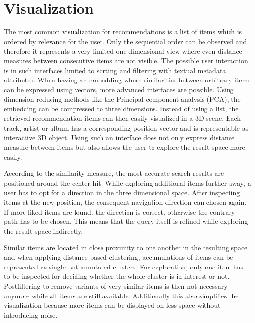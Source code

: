 \documentclass[sigconf]{acmart}
\begin{document}
\section{Visualization}
The most common visualization for recommendations is a list of items which is ordered by relevance for the user. Only the sequential order can be observed and therefore it represents a very limited one dimensional view where even distance measures between consecutive items are not visible. The possible user interaction is in such interfaces limited to sorting and filtering with textual metadata attributes.
When having an embedding where similarities between arbitrary items can be expressed using vectors, more advanced interfaces are possible. Using dimension reducing methods like the Principal component analysis (PCA), the embedding can be compressed to three dimensions. Instead of using a list, the retrieved recommendation items can then easily visualized in a 3D scene. Each track, artist or album has a corresponding position vector and is representable as interactive 3D object. Using such an interface does not only express distance measure between items but also allows the user to explore the result space more easily. 

According to the similarity measure, the most accurate search results are positioned around the center hit. While exploring additional items further away, a user has to opt for a direction in the three dimensional space. After inspecting items at the new position, the consequent navigation direction can chosen again. If more liked items are found, the direction is correct, otherwise the contrary path has to be chosen. This means that the query itself is refined while exploring the result space indirectly. %

Similar items are located in close proximity to one another in the resulting space and when applying distance based clustering, accumulations of items can be represented as single but annotated clusters. For exploration, only one item has to be inspected for deciding whether the whole cluster is in interest or not. Postfiltering to remove variants of very similar items is then not necessary anymore while all items are still available. Additionally this also simplifies the visualization because more items can be displayed on less space without introducing noise.\\
\end{document}
